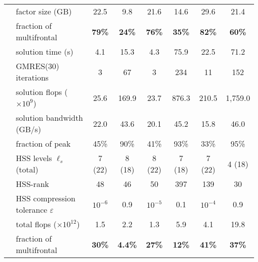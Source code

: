 \documentclass{article}
\begin{document}
\begin{table}[htp!]
\begin{center}
\begin{tabular}{|c|l||c|c|c|c|c|c|}
      \hhline{|~-||-|-|-|-|-|-|}                                                               
      &                        factor size (GB) &   22.5   &   9.8  &  21.6  & 14.6   &  29.6 & 21.4 \\ 
      &      \qquad fraction of multifrontal      &  \textbf{79\%}   & \textbf{24\%}    & \textbf{76\%}   & \textbf{35\%}   & \textbf{82\%}  & \textbf{60\%} \\
      \hhline{|~-||-|-|-|-|-|-|}                                                               
      &                       solution time (s) &   4.1   & 15.3    &  4.3   &  75.9  & 22.5  &  71.2 \\ 
      \hhline{|~-||-|-|-|-|-|-|}                                                               
      &                      GMRES(30) iterations  &   3     &   67    &  3     &  234  &  11   &  152 \\ 
      \hhline{|~-||-|-|-|-|-|-|}                                                               
      &          solution flops ($\times10^{9}$) &  25.6   &  169.9   &  23.7 &  876.3 &  210.5 & 1,759.0 \\ 
      \hhline{|~-||-|-|-|-|-|-|}                                                         
      &                solution bandwidth (GB/s) & 22.0  & 43.6  & 20.1  & 45.2  & 15.8 & 46.0  \\
      &   \qquad fraction of peak                &  45\% & 90\%  &  41\%  & 93\%  & 33\% & 95\% \\
      \hhline{|~-||-|-|-|-|-|-|}                                                               
      &             HSS levels $\ell_s$ (total) &  7 (22)  &  8 (18) &  8 (22) & 7 (18) & 7 (22) &  4 (18) \\ 
      \hhline{|~-||-|-|-|-|-|-|}                                                               
      &                                HSS-rank &  48      &   46    &  50    &  397   &  139  & 30 \\ 
      \hhline{|~-||-|-|-|-|-|-|}                                                               
      & HSS compression tolerance $\varepsilon$ & $10^{-6}$ & 0.9 &  $10^{-5}$ &  0.1  & $10^{-4}$ & 0.9 \\ 
      \hhline{|~-||-|-|-|-|-|-|}                                                               
      &          total flops ($\times10^{12}$) &  1.5    &  2.2 & 1.3 & 5.9 & 4.1 & 19.8    \\ 
      &    \qquad fraction of multifrontal     &  \textbf{30\%} & \textbf{4.4\%} & \textbf{27\%} & \textbf{12\%} & \textbf{41\%} & \textbf{37\%}  \\

\end{tabular}
\end{center}
\end{table}
\end{document}
